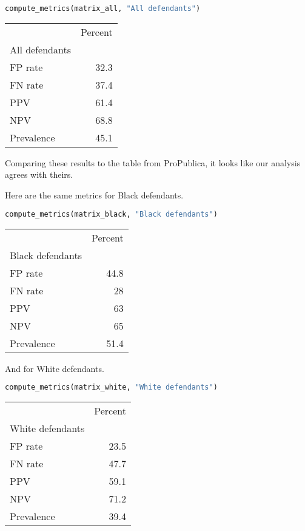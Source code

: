 \begin{lstlisting}[language=Python,style=source]
compute_metrics(matrix_all, "All defendants")
\end{lstlisting}

\begin{tabular}{lr}
\toprule
 & Percent \\
All defendants &  \\
\midrule
FP rate & 32.3 \\
FN rate & 37.4 \\
PPV & 61.4 \\
NPV & 68.8 \\
Prevalence & 45.1 \\
\bottomrule
\end{tabular}

Comparing these results to the table from ProPublica, it looks like our
analysis agrees with theirs.

\pagebreak

Here are the same metrics for Black defendants.

\begin{lstlisting}[language=Python,style=source]
compute_metrics(matrix_black, "Black defendants")
\end{lstlisting}

\begin{tabular}{lr}
\toprule
 & Percent \\
Black defendants &  \\
\midrule
FP rate & 44.8 \\
FN rate & 28 \\
PPV & 63 \\
NPV & 65 \\
Prevalence & 51.4 \\
\bottomrule
\end{tabular}

And for White defendants.

\begin{lstlisting}[language=Python,style=source]
compute_metrics(matrix_white, "White defendants")
\end{lstlisting}

\begin{tabular}{lr}
\toprule
 & Percent \\
White defendants &  \\
\midrule
FP rate & 23.5 \\
FN rate & 47.7 \\
PPV & 59.1 \\
NPV & 71.2 \\
Prevalence & 39.4 \\
\bottomrule
\end{tabular}

